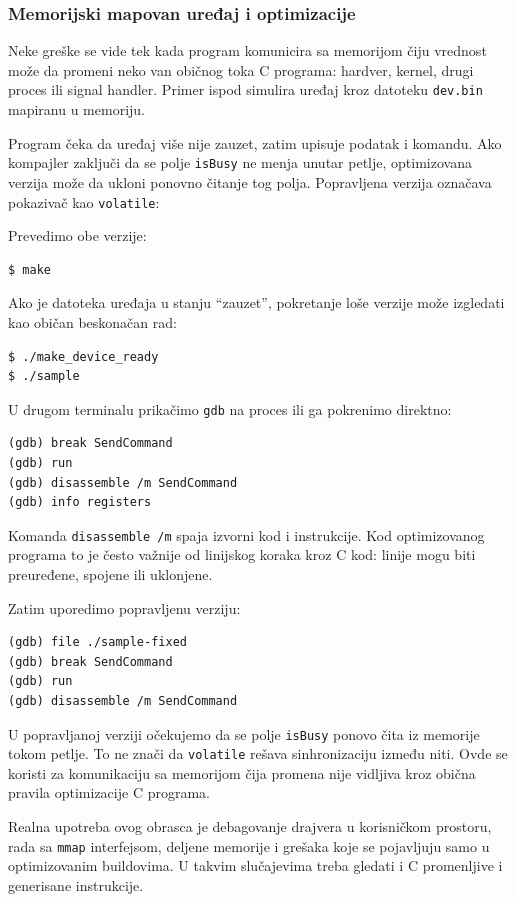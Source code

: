 \subsubsection{Memorijski mapovan uređaj i optimizacije}\label{gdb-mmap-volatile}

Neke greške se vide tek kada program komunicira sa memorijom čiju vrednost može da promeni neko van običnog toka C programa: hardver, kernel, drugi proces ili signal handler. Primer ispod simulira uređaj kroz datoteku \texttt{dev.bin} mapiranu u memoriju.


Program čeka da uređaj više nije zauzet, zatim upisuje podatak i komandu. Ako kompajler zaključi da se polje \texttt{isBusy} ne menja unutar petlje, optimizovana verzija može da ukloni ponovno čitanje tog polja. Popravljena verzija označava pokazivač kao \texttt{volatile}:


Prevedimo obe verzije:

\begin{verbatim}
$ make
\end{verbatim}

Ako je datoteka uređaja u stanju ``zauzet'', pokretanje loše verzije može izgledati kao običan beskonačan rad:

\begin{verbatim}
$ ./make_device_ready
$ ./sample
\end{verbatim}

U drugom terminalu prikačimo \texttt{gdb} na proces ili ga pokrenimo direktno:

\begin{verbatim}
(gdb) break SendCommand
(gdb) run
(gdb) disassemble /m SendCommand
(gdb) info registers
\end{verbatim}

Komanda \texttt{disassemble /m} spaja izvorni kod i instrukcije. Kod optimizovanog programa to je često važnije od linijskog koraka kroz C kod: linije mogu biti preuređene, spojene ili uklonjene.

Zatim uporedimo popravljenu verziju:

\begin{verbatim}
(gdb) file ./sample-fixed
(gdb) break SendCommand
(gdb) run
(gdb) disassemble /m SendCommand
\end{verbatim}

U popravljanoj verziji očekujemo da se polje \texttt{isBusy} ponovo čita iz memorije tokom petlje. To ne znači da \texttt{volatile} rešava sinhronizaciju između niti. Ovde se koristi za komunikaciju sa memorijom čija promena nije vidljiva kroz obična pravila optimizacije C programa.

Realna upotreba ovog obrasca je debagovanje drajvera u korisničkom prostoru, rada sa \texttt{mmap} interfejsom, deljene memorije i grešaka koje se pojavljuju samo u optimizovanim buildovima. U takvim slučajevima treba gledati i C promenljive i generisane instrukcije.
